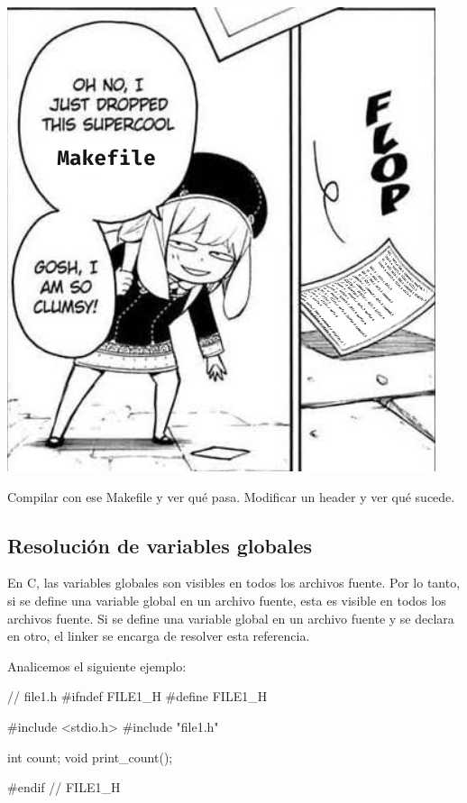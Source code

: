 \documentclass[]{scrartcl}
\begin{document}
\begin{center}
  \includegraphics[scale=0.5]{./img/drop_makefile.png}
\end{center}


\begin{exbox}
  Compilar con ese Makefile y ver qué pasa. Modificar un header y ver qué sucede. 
\end{exbox}

\subsection*{Resolución de variables globales}

En C, las variables globales son visibles en todos los archivos fuente. Por lo tanto, si se define una variable global en un archivo fuente, esta es visible en todos los archivos fuente. Si se define una variable global en un archivo fuente y se declara en otro, el linker se encarga de resolver esta referencia. 

Analicemos el siguiente ejemplo:

\begin{cbox}[]{}
  // file1.h
  #ifndef FILE1_H
  #define FILE1_H

  #include <stdio.h>
  #include "file1.h"

  int count;
  void print_count();

  #endif // FILE1_H
\end{cbox}
\end{document}
